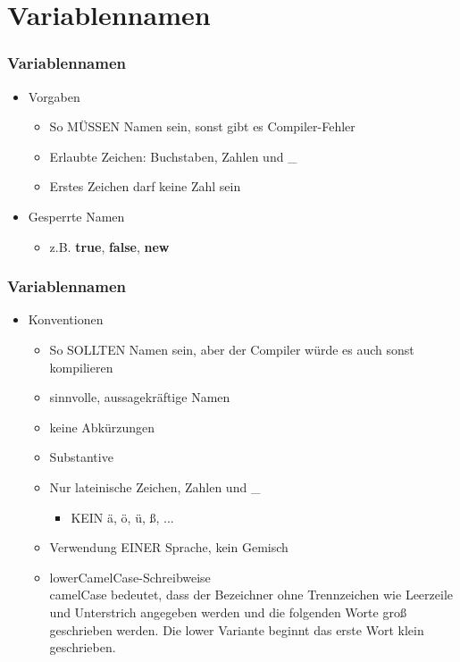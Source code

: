 \documentclass[final]{beamer}
\newcommand{\keyWord}[1]{\textbf{#1}}
\begin{document}
\section{Variablennamen}
\begin{frame}[fragile]
  \frametitle{Variablennamen}
  \begin{itemize}
    \item Vorgaben
    \begin{itemize}
      \item So MÜSSEN Namen sein, sonst gibt es Compiler-Fehler
      \item Erlaubte Zeichen: Buchstaben, Zahlen und \_
      \item Erstes Zeichen darf keine Zahl sein
    \end{itemize}
    \item Gesperrte Namen
      \begin{itemize}
        \item z.B. \keyWord{true}, \keyWord{false}, \keyWord{new}
      \end{itemize}
  \end{itemize}
\end{frame}

\begin{frame}
  \frametitle{Variablennamen}
  \begin{itemize}
    \item Konventionen
    \begin{itemize}
      \item So SOLLTEN Namen sein, aber der Compiler würde es auch sonst kompilieren
      \item sinnvolle, aussagekräftige Namen
      \item keine Abkürzungen
      \item Substantive
      \item Nur lateinische Zeichen, Zahlen und \_
      \begin{itemize}
        \item KEIN ä, ö, ü, ß, ...    
      \end{itemize}
	  \item Verwendung EINER Sprache, kein Gemisch      
      \item lowerCamelCase-Schreibweise \\ \tiny camelCase bedeutet, dass der Bezeichner ohne Trennzeichen wie Leerzeile und Unterstrich angegeben werden und die folgenden Worte groß geschrieben werden. Die lower Variante beginnt das erste Wort klein geschrieben.
    \end{itemize}
  \end{itemize}
\end{frame}
\end{document}
